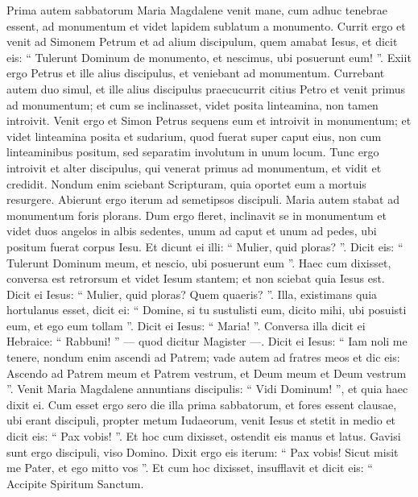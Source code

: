 \begin{biblechapter}
\begin{biblechapter}
\begin{biblechapter}
\begin{biblechapter}
\begin{biblechapter}
\begin{biblechapter}
\begin{biblechapter}
\begin{biblechapter}
\begin{biblechapter}
\begin{biblechapter}
\begin{biblechapter}
\begin{biblechapter}
\begin{biblechapter}
\begin{biblechapter}
\begin{biblechapter}
\begin{biblechapter}
\begin{biblechapter}
\begin{biblechapter}
\begin{biblechapter}
\begin{biblechapter}
\verse Prima autem sabbatorum Maria Magdalene venit mane, cum adhuc tenebrae essent, ad monumentum et videt lapidem sublatum a monumento. 
\verse Currit ergo et venit ad Simonem Petrum et ad alium discipulum, quem amabat Iesus, et dicit eis: “ Tulerunt Dominum de monumento, et nescimus, ubi posuerunt eum! ”. 
\verse Exiit ergo Petrus et ille alius discipulus, et veniebant ad monumentum. 
\verse Currebant autem duo simul, et ille alius discipulus praecucurrit citius Petro et venit primus ad monumentum; 
\verse et cum se inclinasset, videt posita linteamina, non tamen introivit. 
\verse Venit ergo et Simon Petrus sequens eum et introivit in monumentum; et videt linteamina posita 
\verse et sudarium, quod fuerat super caput eius, non cum linteaminibus positum, sed separatim involutum in unum locum. 
\verse Tunc ergo introivit et alter discipulus, qui venerat primus ad monumentum, et vidit et credidit. 
\verse Nondum enim sciebant Scripturam, quia oportet eum a mortuis resurgere. 
\verse Abierunt ergo iterum ad semetipsos discipuli. 
\verse Maria autem stabat ad monumentum foris plorans. Dum ergo fleret, inclinavit se in monumentum 
\verse et videt duos angelos in albis sedentes, unum ad caput et unum ad pedes, ubi positum fuerat corpus Iesu. 
\verse Et dicunt ei illi: “ Mulier, quid ploras? ”. Dicit eis: “ Tulerunt Dominum meum, et nescio, ubi posuerunt eum ”. 
\verse Haec cum dixisset, conversa est retrorsum et videt Iesum stantem; et non sciebat quia Iesus est. 
\verse Dicit ei Iesus: “ Mulier, quid ploras? Quem quaeris? ”. Illa, existimans quia hortulanus esset, dicit ei: “ Domine, si tu sustulisti eum, dicito mihi, ubi posuisti eum, et ego eum tollam ”. 
\verse Dicit ei Iesus: “ Maria! ”. Conversa illa dicit ei Hebraice: “ Rabbuni! ” — quod dicitur Magister —. 
\verse Dicit ei Iesus: “ Iam noli me tenere, nondum enim ascendi ad Patrem; vade autem ad fratres meos et dic eis: Ascendo ad Patrem meum et Patrem vestrum, et Deum meum et Deum vestrum ”. 
\verse Venit Maria Magdalene annuntians discipulis: “ Vidi Dominum! ”, et quia haec dixit ei.
 \verse Cum esset ergo sero die illa prima sabbatorum, et fores essent clausae, ubi erant discipuli, propter metum Iudaeorum, venit Iesus et stetit in medio et dicit eis: “ Pax vobis! ”. 
\verse Et hoc cum dixisset, ostendit eis manus et latus. Gavisi sunt ergo discipuli, viso Domino. 
\verse Dixit ergo eis iterum: “ Pax vobis! Sicut misit me Pater, et ego mitto vos ”. 
\verse Et cum hoc dixisset, insufflavit et dicit eis: “ Accipite Spiritum Sanctum. 

\end{biblechapter}
\end{biblechapter}
\end{biblechapter}
\end{biblechapter}
\end{biblechapter}
\end{biblechapter}
\end{biblechapter}
\end{biblechapter}
\end{biblechapter}
\end{biblechapter}
\end{biblechapter}
\end{biblechapter}
\end{biblechapter}
\end{biblechapter}
\end{biblechapter}
\end{biblechapter}
\end{biblechapter}
\end{biblechapter}
\end{biblechapter}
\end{biblechapter}
